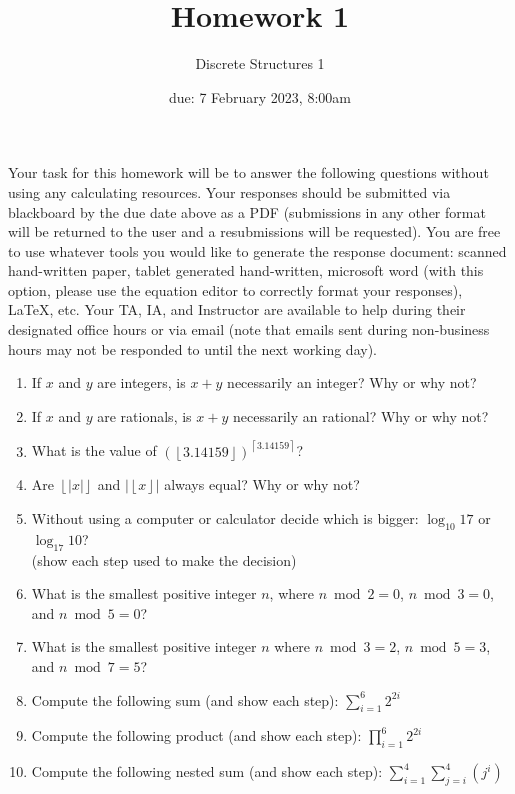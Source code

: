 \documentclass[11pt, oneside]{article}   	%
\title{Homework 1}
\author{Discrete Structures 1}
\date{due: 7 February 2023, 8:00am}							%
\begin{document}
\maketitle

Your task for this homework will be to answer the following questions without using any calculating resources. 
Your responses should be submitted via blackboard by the due date above as a PDF (submissions in any other format will be returned to the user and a resubmissions will be requested). 
You are free to use whatever tools you would like to generate the response document: 
scanned hand-written paper, 
tablet generated hand-written, 
microsoft word (with this option, please use the equation editor to correctly format your responses), 
\LaTeX, etc.
Your TA, IA, and Instructor are available to help during their designated office hours or via email 
(note that emails sent during non-business hours may not be responded to until the next working day). 

\begin{enumerate}
\item If $x$ and $y$ are integers, is $x+y$ necessarily an integer? Why or why not? 
\item If $x$ and $y$ are rationals, is $x+y$ necessarily an rational? Why or why not? 
\item What is the value of $\left(\left\lfloor3.14159\right\rfloor\right)^{\left\lceil3.14159\right\rceil}$?
\item Are $\left\lfloor\left| x \right|\right\rfloor$ and $\left|\left\lfloor x \right\rfloor\right|$ always equal? Why or why not?
\item Without using a computer or calculator decide which is bigger: $\log_{10}17$ or $\log_{17}10$? \\(show each step used to make the decision)
\item What is the smallest positive integer $n$, where $n\bmod 2=0$, $n\bmod3=0$, and $n\bmod5=0$?
\item What is the smallest positive integer $n$ where $n \bmod3=2$, $n \bmod5=3$, and $n \bmod 7=5$?
\item Compute the following sum (and show each step): $\displaystyle \sum_{i=1}^{6}2^{2i}$
\item Compute the following product (and show each step): $\displaystyle \prod_{i=1}^{6}2^{2i}$
\item Compute the following nested sum (and show each step): $\displaystyle \sum_{i=1}^4\sum_{j=i}^4 \left(j^i\right)$
\end{enumerate}
\end{document}
